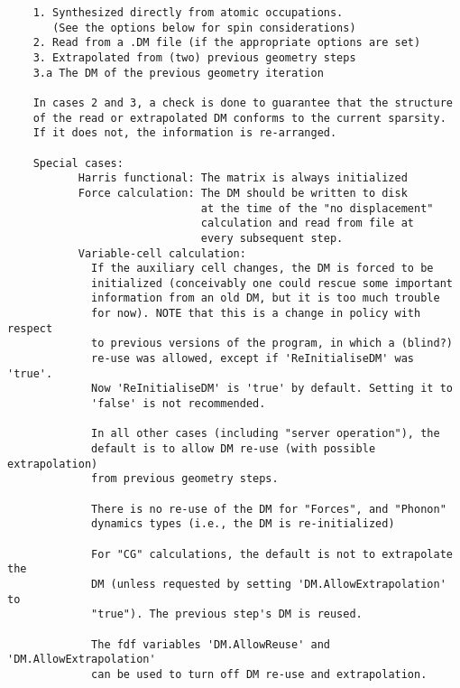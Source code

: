 \documentclass[11pt]{article}
\begin{document}
\begin{verbatim}
    1. Synthesized directly from atomic occupations.
       (See the options below for spin considerations)
    2. Read from a .DM file (if the appropriate options are set)
    3. Extrapolated from (two) previous geometry steps
    3.a The DM of the previous geometry iteration

    In cases 2 and 3, a check is done to guarantee that the structure
    of the read or extrapolated DM conforms to the current sparsity.
    If it does not, the information is re-arranged.

    Special cases:
           Harris functional: The matrix is always initialized
           Force calculation: The DM should be written to disk
                              at the time of the "no displacement"
                              calculation and read from file at
                              every subsequent step.
           Variable-cell calculation:
             If the auxiliary cell changes, the DM is forced to be
             initialized (conceivably one could rescue some important
             information from an old DM, but it is too much trouble
             for now). NOTE that this is a change in policy with respect
             to previous versions of the program, in which a (blind?)
             re-use was allowed, except if 'ReInitialiseDM' was 'true'.
             Now 'ReInitialiseDM' is 'true' by default. Setting it to
             'false' is not recommended.

             In all other cases (including "server operation"), the
             default is to allow DM re-use (with possible extrapolation)
             from previous geometry steps.

             There is no re-use of the DM for "Forces", and "Phonon"
             dynamics types (i.e., the DM is re-initialized)

             For "CG" calculations, the default is not to extrapolate the
             DM (unless requested by setting 'DM.AllowExtrapolation' to
             "true"). The previous step's DM is reused.

             The fdf variables 'DM.AllowReuse' and 'DM.AllowExtrapolation'
             can be used to turn off DM re-use and extrapolation.

\end{verbatim}
\end{document}
